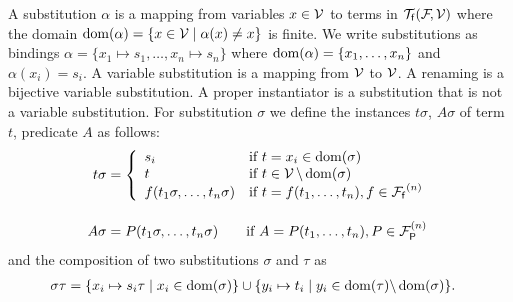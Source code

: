 
\begin{definition}\label{def:substitution}
	A {\myem substitution} $\alpha$ is a mapping from variables $x\in{\mathcal V}$ to terms in ${{\mathcal T}_{\mathsf f}({\mathcal F}\!,{\mathcal V})}$
	where the {\myem domain }$\operatorname{dom}(\alpha) = \{ x\in{\mathcal V}\mid\alpha(x) \neq x \}$ is finite.
	We write substitutions as bindings $\alpha=\{ x_1\mapsto s_1,\ldots,x_n\mapsto s_n \}$
	where $\operatorname{dom}(\alpha)=\{ x_1,\ldots,x_n \}$ and $\alpha(x_i)=s_i$.
	A {\myem variable substitution} is a mapping from ${\mathcal V}$ to ${\mathcal V}$.
	A {\myem renaming} is a bijective variable substitution.
	A {\myem proper instantiator} is a substitution that is not a variable substitution.
	For substitution $\sigma$ we define the {\myem instances }$t\sigma$, $A\sigma$ of term $t$, 
	predicate $A$ as follows:
	\begin{align*}
		t\sigma &= \left\{\begin{array}{ll}
			s_i 					& \text{if }t=x_i\in\dom(\sigma)\\
			t					& \text{if }t\in\mcV\,\backslash\dom(\sigma)\\
			f(t_1\sigma,\ldots,t_n\sigma)	&\text{if }t=f(t_1,\ldots,t_n), f\in\mcFf^{(n)}
		\end{array}\right.\\[1em]
%		
		A\sigma &= P(t_1\sigma,\ldots,t_n\sigma)\qquad\text{if }A=P(t_1,\ldots,t_n), P\in\mcF_{\mP}^{(n)} \\
	\end{align*}
	and the {\myem composition} of two substitutions $\sigma$ and $\tau$ as
	\begin{align*}
		\sigma\tau&=\{ x_i\mapsto s_i\tau\mid x_i\in\operatorname{dom}(\sigma) \}
		\cup
		\{ y_i\mapsto t_i\mid y_i\in\operatorname{dom}(\tau) \backslash \operatorname{dom}(\sigma) \}.
	\end{align*}
	
\end{definition}